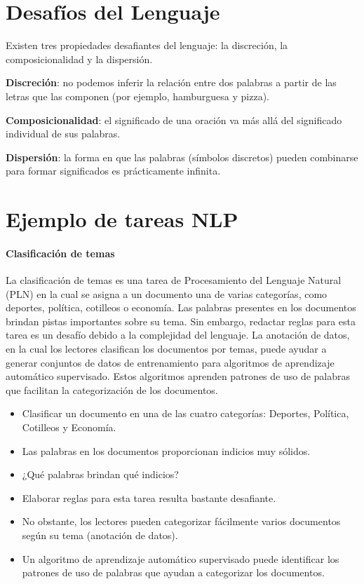\section{Desafíos del Lenguaje}

Existen tres propiedades desafiantes del lenguaje: la discreción, la composicionalidad y la dispersión.

\textbf{Discreción}: no podemos inferir la relación entre dos palabras a partir de las letras que las componen (por ejemplo, hamburguesa y pizza).

\textbf{Composicionalidad}: el significado de una oración va más allá del significado individual de sus palabras.

\textbf{Dispersión}: la forma en que las palabras (símbolos discretos) pueden combinarse para formar significados es prácticamente infinita.



\section{Ejemplo de tareas NLP}


\paragraph{Clasificación de temas}

La clasificación de temas es una tarea de Procesamiento del Lenguaje Natural (PLN) en la cual se asigna a un documento una de varias categorías, como deportes, política, cotilleos o economía. Las palabras presentes en los documentos brindan pistas importantes sobre su tema. Sin embargo, redactar reglas para esta tarea es un desafío debido a la complejidad del lenguaje. La anotación de datos, en la cual los lectores clasifican los documentos por temas, puede ayudar a generar conjuntos de datos de entrenamiento para algoritmos de aprendizaje automático supervisado. Estos algoritmos aprenden patrones de uso de palabras que facilitan la categorización de los documentos.

\begin{itemize}
\item Clasificar un documento en una de las cuatro categorías: Deportes, Política, Cotilleos y Economía.
\item Las palabras en los documentos proporcionan indicios muy sólidos.
\item ¿Qué palabras brindan qué indicios?
\item Elaborar reglas para esta tarea resulta bastante desafiante.
\item No obstante, los lectores pueden categorizar fácilmente varios documentos según su tema (anotación de datos).
\item Un algoritmo de aprendizaje automático supervisado puede identificar los patrones de uso de palabras que ayudan a categorizar los documentos.
\end{itemize}
